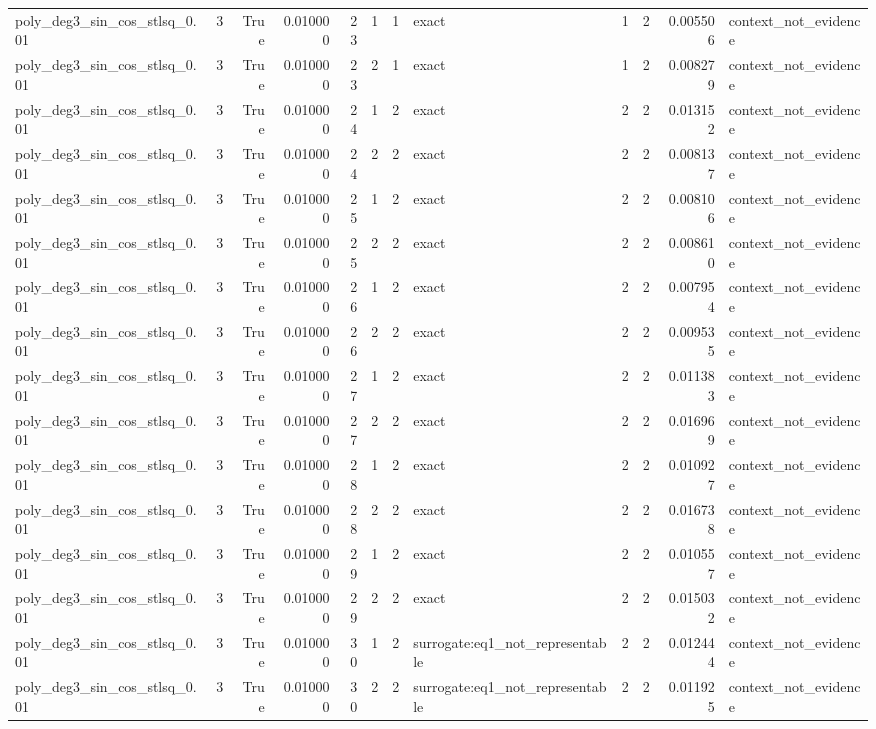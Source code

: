 \begin{tabular}{lrrrrrrlrrrl}
poly\_deg3\_sin\_cos\_stlsq\_0.01 & 3 & True & 0.010000 & 23 & 1 & 1 & exact & 1 & 2 & 0.005506 & context\_not\_evidence \\
poly\_deg3\_sin\_cos\_stlsq\_0.01 & 3 & True & 0.010000 & 23 & 2 & 1 & exact & 1 & 2 & 0.008279 & context\_not\_evidence \\
poly\_deg3\_sin\_cos\_stlsq\_0.01 & 3 & True & 0.010000 & 24 & 1 & 2 & exact & 2 & 2 & 0.013152 & context\_not\_evidence \\
poly\_deg3\_sin\_cos\_stlsq\_0.01 & 3 & True & 0.010000 & 24 & 2 & 2 & exact & 2 & 2 & 0.008137 & context\_not\_evidence \\
poly\_deg3\_sin\_cos\_stlsq\_0.01 & 3 & True & 0.010000 & 25 & 1 & 2 & exact & 2 & 2 & 0.008106 & context\_not\_evidence \\
poly\_deg3\_sin\_cos\_stlsq\_0.01 & 3 & True & 0.010000 & 25 & 2 & 2 & exact & 2 & 2 & 0.008610 & context\_not\_evidence \\
poly\_deg3\_sin\_cos\_stlsq\_0.01 & 3 & True & 0.010000 & 26 & 1 & 2 & exact & 2 & 2 & 0.007954 & context\_not\_evidence \\
poly\_deg3\_sin\_cos\_stlsq\_0.01 & 3 & True & 0.010000 & 26 & 2 & 2 & exact & 2 & 2 & 0.009535 & context\_not\_evidence \\
poly\_deg3\_sin\_cos\_stlsq\_0.01 & 3 & True & 0.010000 & 27 & 1 & 2 & exact & 2 & 2 & 0.011383 & context\_not\_evidence \\
poly\_deg3\_sin\_cos\_stlsq\_0.01 & 3 & True & 0.010000 & 27 & 2 & 2 & exact & 2 & 2 & 0.016969 & context\_not\_evidence \\
poly\_deg3\_sin\_cos\_stlsq\_0.01 & 3 & True & 0.010000 & 28 & 1 & 2 & exact & 2 & 2 & 0.010927 & context\_not\_evidence \\
poly\_deg3\_sin\_cos\_stlsq\_0.01 & 3 & True & 0.010000 & 28 & 2 & 2 & exact & 2 & 2 & 0.016738 & context\_not\_evidence \\
poly\_deg3\_sin\_cos\_stlsq\_0.01 & 3 & True & 0.010000 & 29 & 1 & 2 & exact & 2 & 2 & 0.010557 & context\_not\_evidence \\
poly\_deg3\_sin\_cos\_stlsq\_0.01 & 3 & True & 0.010000 & 29 & 2 & 2 & exact & 2 & 2 & 0.015032 & context\_not\_evidence \\
poly\_deg3\_sin\_cos\_stlsq\_0.01 & 3 & True & 0.010000 & 30 & 1 & 2 & surrogate:eq1\_not\_representable & 2 & 2 & 0.012444 & context\_not\_evidence \\
poly\_deg3\_sin\_cos\_stlsq\_0.01 & 3 & True & 0.010000 & 30 & 2 & 2 & surrogate:eq1\_not\_representable & 2 & 2 & 0.011925 & context\_not\_evidence \\

\end{tabular}
